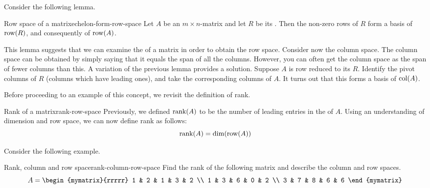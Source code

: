 Consider the following lemma.

\begin{lemma}{Row space of a {\ef} matrix}{echelon-form-row-space}
  Let $A$ be an $m \times n$-matrix and let $R$ be its {\ef}. Then the
  non-zero rows of $R$ form a basis of $\row(R)$, and
  consequently of $\row(A)$.
\end{lemma}

This lemma suggests that we can examine the {\ef} of a matrix in order
to obtain the row space. Consider now the column space. The column
space can be obtained by simply saying that it equals the span of all
the columns. However, you can often get the column space as the span
of fewer columns than this. A variation of the previous lemma provides
a solution. Suppose $A$ is row reduced to its {\ef} $R$. Identify the
pivot columns of $R$ (columns which have leading ones), and take the
corresponding columns of $A$. It turns out that this forms a basis of
$\col(A)$.

Before proceeding to an example of this concept, we revisit the
definition of rank.

\begin{definition}{Rank of a matrix}{rank-row-space}
  Previously, we defined $\rank(A)$ to be the number of leading
  entries in the {\ef} of $A$. Using an understanding of dimension and
  row space, we can now define rank as follows:
  \begin{equation*}
    \mbox{rank}(A) = \dim(\row(A))
  \end{equation*}
\end{definition}

Consider the following example.

\begin{example}{Rank, column and row space}{rank-column-row-space}
  Find the rank of the following matrix and describe the column and
  row spaces.
  \begin{equation*}
    A =
    \begin{mymatrix}{rrrrr}
      1 & 2 & 1 & 3 & 2 \\
      1 & 3 & 6 & 0 & 2 \\
      3 & 7 & 8 & 6 & 6
    \end{mymatrix}
  \end{equation*}
\end{example}

